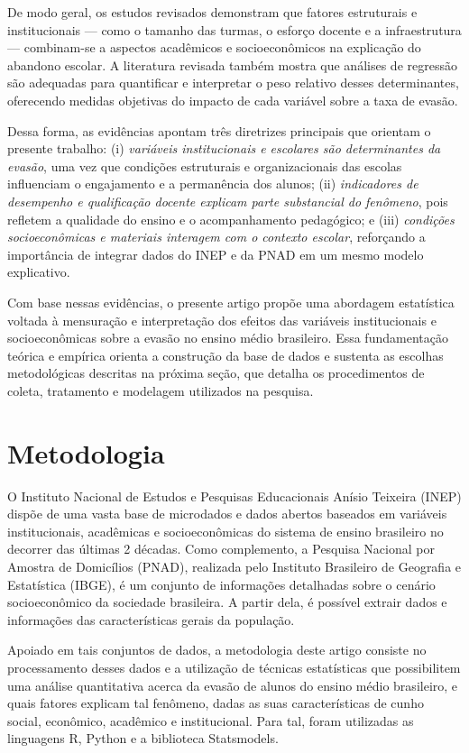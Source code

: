 \documentclass[english, spanish, brazilian]{RBIEarticle} %
\begin{document}
De modo geral, os estudos revisados demonstram que fatores estruturais e institucionais — como o tamanho das turmas, o esforço docente e a infraestrutura — combinam-se a aspectos acadêmicos e socioeconômicos na explicação do abandono escolar. A literatura revisada também mostra que análises de regressão são adequadas para quantificar e interpretar o peso relativo desses determinantes, oferecendo medidas objetivas do impacto de cada variável sobre a taxa de evasão. 

Dessa forma, as evidências apontam três diretrizes principais que orientam o presente trabalho: (i) \textit{variáveis institucionais e escolares são determinantes da evasão}, uma vez que condições estruturais e organizacionais das escolas influenciam o engajamento e a permanência dos alunos; (ii) \textit{indicadores de desempenho e qualificação docente explicam parte substancial do fenômeno}, pois refletem a qualidade do ensino e o acompanhamento pedagógico; e (iii) \textit{condições socioeconômicas e materiais interagem com o contexto escolar}, reforçando a importância de integrar dados do INEP e da PNAD em um mesmo modelo explicativo.

Com base nessas evidências, o presente artigo propõe uma abordagem estatística voltada à mensuração e interpretação dos efeitos das variáveis institucionais e socioeconômicas sobre a evasão no ensino médio brasileiro. Essa fundamentação teórica e empírica orienta a construção da base de dados e sustenta as escolhas metodológicas descritas na próxima seção, que detalha os procedimentos de coleta, tratamento e modelagem utilizados na pesquisa.

\section{Metodologia}
O Instituto Nacional de Estudos e Pesquisas Educacionais Anísio Teixeira (INEP) dispõe de uma vasta base de microdados e dados abertos baseados em variáveis institucionais, acadêmicas e socioeconômicas do sistema de ensino brasileiro no decorrer das últimas 2 décadas. Como complemento, a Pesquisa Nacional por Amostra de Domicílios (PNAD), realizada pelo Instituto Brasileiro de Geografia e Estatística (IBGE), é um conjunto de informações detalhadas sobre o cenário socioeconômico da sociedade brasileira. A partir dela, é possível extrair dados e informações das características gerais da população.  

Apoiado em tais conjuntos de dados, a metodologia deste artigo consiste no processamento desses dados e a utilização de técnicas estatísticas que possibilitem uma análise quantitativa acerca da evasão de alunos do ensino médio brasileiro, e quais fatores explicam tal fenômeno, dadas as suas características de cunho social, econômico, acadêmico e institucional. Para tal, foram utilizadas as linguagens R, Python e a biblioteca Statsmodels.  
\end{document}
